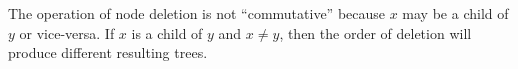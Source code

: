 The operation of node deletion is not ``commutative'' because $ x $ may be a child of $ y $ or vice-versa. If $ x $ is a child of $ y $ and $ x \neq y $, then the order of deletion will produce different resulting trees.